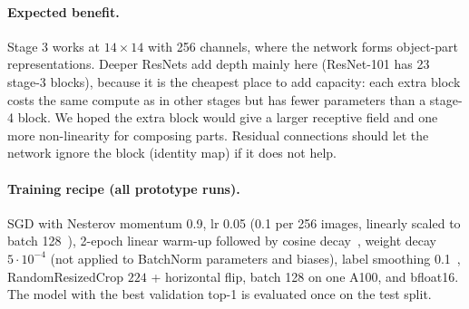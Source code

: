 \documentclass[10pt,twocolumn,letterpaper]{article}
\begin{document}
\paragraph{Expected benefit.}
Stage 3 works at $14{\times}14$ with 256 channels, where the network forms object-part representations. Deeper ResNets add depth mainly here (ResNet-101 has 23 stage-3 blocks), because it is the cheapest place to add capacity: each extra block costs the same compute as in other stages but has fewer parameters than a stage-4 block. We hoped the extra block would give a larger receptive field and one more non-linearity for composing parts. Residual connections should let the network ignore the block (identity map) if it does not help.

\begin{table}[t]
\centering\footnotesize\setlength{\tabcolsep}{4pt}
\caption{ResNet-34 \vs our ResNet-36 for a $224{\times}224$ input. A block is two $3{\times}3$ conv layers with a skip connection.}
\label{tab:arch}
\end{table}

\paragraph{Training recipe (all prototype runs).}
SGD with Nesterov momentum 0.9, lr 0.05 (0.1 per 256 images, linearly scaled to batch 128~\cite{goyal2017imagenet1hour}), 2-epoch linear warm-up followed by cosine decay~\cite{loshchilov2017sgdr}, weight decay $5\cdot10^{-4}$ (not applied to BatchNorm parameters and biases), label smoothing 0.1~\cite{szegedy2016inception}, RandomResizedCrop $224$ + horizontal flip, batch 128 on one A100, and bfloat16. The model with the best validation top-1 is evaluated once on the test split.
\end{document}
